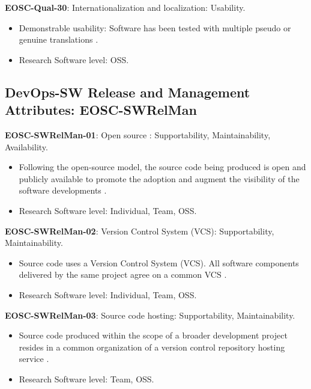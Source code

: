 \textbf{EOSC-Qual-30}: Internationalization and localization: Usability.

\begin{itemize}
    \item Demonstrable usability: Software has been tested with multiple pseudo or genuine translations \cite{shepherdson_cessda_2019}.
    \item Research Software level: OSS.
\end{itemize}

\subsection{DevOps-SW Release and Management Attributes: EOSC-SWRelMan}

\textbf{EOSC-SWRelMan-01}: Open source : Supportability, Maintainability, Availability.

\begin{itemize}
    \item Following the open-source model, the source code being produced is open and publicly available to promote the adoption and augment the visibility of the software developments \cite{orviz_set_2017,raymond_software_2013}.
    \item Research Software level: Individual, Team, OSS.
\end{itemize}

\textbf{EOSC-SWRelMan-02}: Version Control System (VCS): Supportability, Maintainability.

\begin{itemize}
    \item Source code uses a Version Control System (VCS). All software components delivered by the same project agree on a common VCS \cite{orviz_set_2017}.
    \item Research Software level: Individual, Team, OSS.
\end{itemize}

\textbf{EOSC-SWRelMan-03}: Source code hosting: Supportability, Maintainability.

\begin{itemize}
    \item Source code produced within the scope of a broader development project resides in a common organization of a version control repository hosting service \cite{orviz_set_2017}.
    \item Research Software level: Team, OSS.
\end{itemize}

